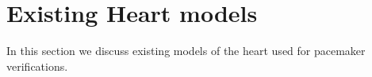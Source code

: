 \section{Existing Heart models }
\label{sec:existingHeartModels}

In this section we discuss existing models 
of the heart used for pacemaker verifications.

\begin{figure*}
	
\end{figure*}
